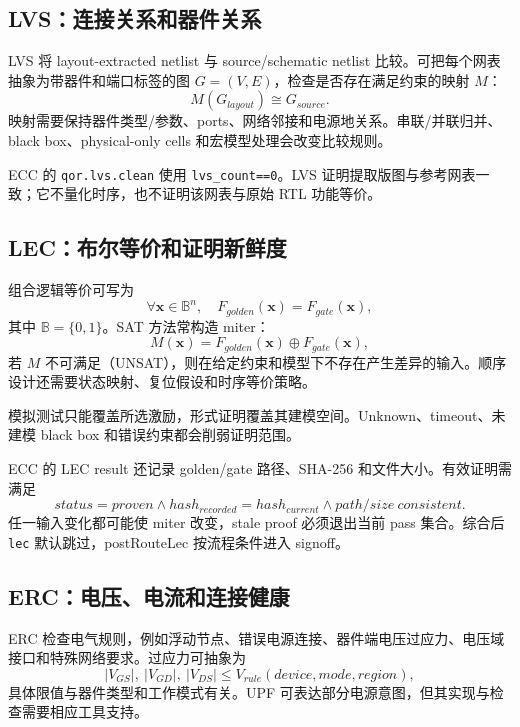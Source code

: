 \documentclass[UTF8,a4paper,11pt,fontset=fandol]{ctexart}
\numberwithin{equation}{section}
\newcommand{\code}[1]{\nolinkurl{#1}}
\begin{document}
\subsection{LVS：连接关系和器件关系}

LVS 将 layout-extracted netlist 与 source/schematic netlist 比较。可把每个网表抽象为带器件和端口标签的图 $G=(V,E)$，检查是否存在满足约束的映射 $M$：
\begin{equation}
M(G_{layout})\cong G_{source}.
\end{equation}
映射需要保持器件类型/参数、ports、网络邻接和电源地关系。串联/并联归并、black box、physical-only cells 和宏模型处理会改变比较规则。

ECC 的 \code{qor.lvs.clean} 使用 \code{lvs_count==0}。LVS 证明提取版图与参考网表一致；它不量化时序，也不证明该网表与原始 RTL 功能等价。

\subsection{LEC：布尔等价和证明新鲜度}

组合逻辑等价可写为
\begin{equation}
\forall \mathbf{x}\in\mathbb{B}^n,\quad
F_{golden}(\mathbf{x})=F_{gate}(\mathbf{x}),
\end{equation}
其中 $\mathbb{B}=\{0,1\}$。SAT 方法常构造 miter：
\begin{equation}
M(\mathbf{x})=F_{golden}(\mathbf{x})\oplus F_{gate}(\mathbf{x}),
\end{equation}
若 $M$ 不可满足（UNSAT），则在给定约束和模型下不存在产生差异的输入。顺序设计还需要状态映射、复位假设和时序等价策略\cite{sat}。

模拟测试只能覆盖所选激励，形式证明覆盖其建模空间。Unknown、timeout、未建模 black box 和错误约束都会削弱证明范围。

ECC 的 LEC result 还记录 golden/gate 路径、SHA-256 和文件大小。有效证明需满足
\begin{equation}
status=proven\land hash_{recorded}=hash_{current}
\land path/size\ consistent.
\end{equation}
任一输入变化都可能使 miter 改变，stale proof 必须退出当前 pass 集合。综合后 \code{lec} 默认跳过，postRouteLec 按流程条件进入 signoff。

\subsection{ERC：电压、电流和连接健康}

ERC 检查电气规则，例如浮动节点、错误电源连接、器件端电压过应力、电压域接口和特殊网络要求。过应力可抽象为
\begin{equation}
|V_{GS}|,\ |V_{GD}|,\ |V_{DS}|\le V_{rule}(device,mode,region),
\end{equation}
具体限值与器件类型和工作模式有关。UPF 可表达部分电源意图，但其实现与检查需要相应工具支持\cite{upf}。
\end{document}
